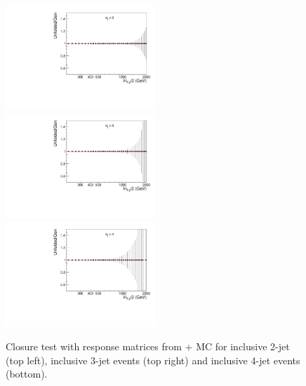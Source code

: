 \begin{figure}[!htp]
\begin{center}
    \includegraphics[width=0.5\textwidth]{Plots_HT_2_150/Ratio_Unfolding_Mad_2_HT_2_150.pdf}%
    \includegraphics[width=0.5\textwidth]{Plots_HT_2_150/Ratio_Unfolding_Mad_3_HT_2_150.pdf}\\
    \includegraphics[width=0.5\textwidth]{Plots_HT_2_150/Ratio_Unfolding_Mad_4_HT_2_150.pdf}
    \caption{Closure test with response matrices from \MadGraphF + \PYTHIAS MC for inclusive 2-jet (top left), inclusive 3-jet events (top right) and inclusive 4-jet events (bottom).}
    \label{fig:unfolded_reco}
  \end{center}
\end{figure}

